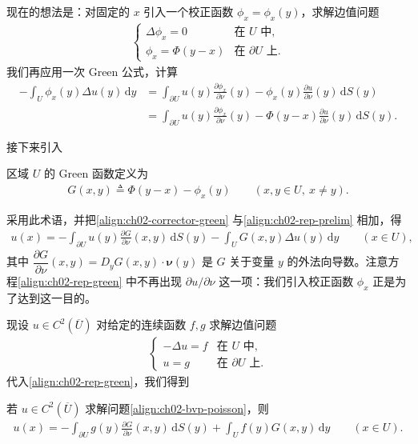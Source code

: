 \documentclass[../../main.tex]{subfiles}
\begin{document}
现在的想法是：对固定的 $x$ 引入一个校正函数 $\phi_x=\phi_x(y)$，求解边值问题
\begin{align}\label{align:ch02-corrector}
\begin{cases}
\Delta\phi_x=0 & \text{在 }U\text{ 中},\\
\phi_x=\Phi(y-x) & \text{在 }\partial U\text{ 上}.
\end{cases}
\end{align}
我们再应用一次 Green 公式，计算
\begin{align}\label{align:ch02-corrector-green}
-\int_U\phi_x(y)\Delta u(y)\,\mathrm{d}y
&=\int_{\partial U}u(y)\frac{\partial\phi_x}{\partial\nu}(y)-\phi_x(y)\frac{\partial u}{\partial\nu}(y)\,\mathrm{d}S(y)\\
&=\int_{\partial U}u(y)\frac{\partial\phi_x}{\partial\nu}(y)-\Phi(y-x)\frac{\partial u}{\partial\nu}(y)\,\mathrm{d}S(y).\nonumber
\end{align}

接下来引入

\begin{definition}\label{definition:ch02-green}
区域 $U$ 的 Green 函数定义为
\begin{align*}
G(x,y)\triangleq\Phi(y-x)-\phi_x(y) \qquad (x,y\in U,\ x\neq y).
\end{align*}
\end{definition}

采用此术语，并把\eqref{align:ch02-corrector-green} 与\eqref{align:ch02-rep-prelim} 相加，得
\begin{align}\label{align:ch02-rep-green}
u(x)=-\int_{\partial U}u(y)\frac{\partial G}{\partial\nu}(x,y)\,\mathrm{d}S(y)-\int_U G(x,y)\Delta u(y)\,\mathrm{d}y \qquad (x\in U),
\end{align}
其中 $\dfrac{\partial G}{\partial\nu}(x,y)=D_y G(x,y)\cdot\boldsymbol{\nu}(y)$ 是 $G$ 关于变量 $y$ 的外法向导数。注意方程\eqref{align:ch02-rep-green} 中不再出现 $\partial u/\partial\nu$ 这一项：我们引入校正函数 $\phi_x$ 正是为了达到这一目的。

现设 $u\in C^2(\overline{U})$ 对给定的连续函数 $f,g$ 求解边值问题
\begin{align}\label{align:ch02-bvp-poisson}
\begin{cases}
-\Delta u=f & \text{在 }U\text{ 中},\\
u=g & \text{在 }\partial U\text{ 上}.
\end{cases}
\end{align}
代入\eqref{align:ch02-rep-green}，我们得到

\begin{theorem}[用Green函数的表示公式]\label{theorem:ch02-green-rep}
若 $u\in C^2(\overline{U})$ 求解问题\eqref{align:ch02-bvp-poisson}，则
\begin{align}\label{align:ch02-green-rep-formula}
u(x)=-\int_{\partial U}g(y)\frac{\partial G}{\partial\nu}(x,y)\,\mathrm{d}S(y)+\int_U f(y)G(x,y)\,\mathrm{d}y \qquad (x\in U).
\end{align}
\end{theorem}
\end{document}
